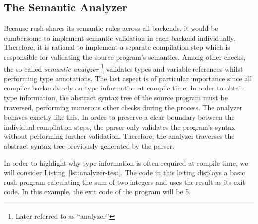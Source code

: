 \subsection{The Semantic Analyzer}
Because rush shares its semantic rules across all backends,
it would be cumbersome to implement semantic validation in each
backend individually. Therefore, it is rational to implement a separate
compilation step which is responsible for validating the source program's semantics.
Among other checks, the so-called \emph{semantic analyzer} \footnote{Later referred to as \enquote{analyzer}} validates types
and variable references whilst performing type annotations. The last aspect is
of particular importance since all compiler backends rely on type information at
compile time. In order to obtain type information, the abstract syntax
tree of the source program must be traversed, performing numerous other checks
during the process. The analyzer behaves exactly like this. In order to
preserve a clear boundary between the individual compilation steps, the parser
only validates the program's syntax without performing further validation.
Therefore, the analyzer traverses the abstract syntax tree previously generated
by the parser.

In order to highlight why type information is often required at compile time, we will consider Listing~\ref{lst:analyzer-test}.
The code in this listing displays a basic rush program calculating the sum of two integers and uses the result as its exit code.
In this example, the exit code of the program will be 5.


